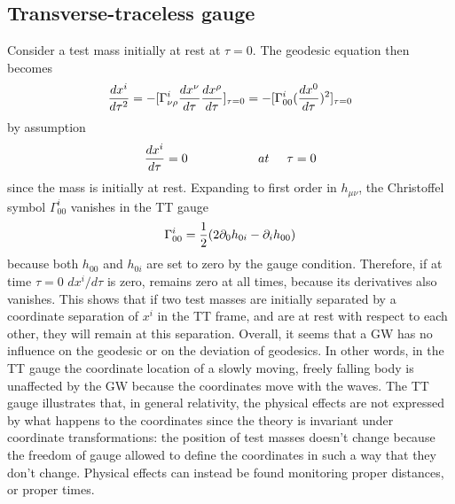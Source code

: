 \documentclass[binding=0.6cm, LaM]{sapthesis}
\begin{document}
\subsection{Transverse-traceless gauge}
Consider a test mass initially at rest at $\tau = 0$. The geodesic equation then becomes
\begin{equation}
{{dx^i}\over{d\tau^2}} = -[\Gamma^i_{\nu\rho}{{dx^{\nu}}\over{d\tau}}{{dx^{\rho}}\over{d\tau}}]_{\tau=0} \\ 
= - [ \Gamma^i_{00}({{dx^0}\over{d\tau}})^2]_{\tau=0}
\end{equation}
by assumption
\begin{equation}
{{dx^i}\over{d\tau}} = 0 \hspace*{2cm} at \hspace*{0.5cm}\tau = 0
\end{equation}
since the mass is initially at rest. Expanding to first order in $h_{\mu\nu}$, the Christoffel symbol $\Gamma^i_{00}$ vanishes in the TT gauge
\begin{equation}
 \Gamma^i_{00} = {1 \over {2}}(2\partial_{0}h_{0i} - \partial_i h_{00})
\end{equation}
because both $h_{00}$ and $h_{0i}$ are set to zero by the gauge condition. Therefore, if at time $\tau = 0$ $dx^i/d\tau$ is zero, remains zero at all times, because its derivatives also vanishes. 
This shows that if two test masses are initially separated by a coordinate separation of $x^i$ in the TT frame, and are at rest with respect to each other, they will remain at this separation. Overall, it seems that a GW has no influence on the geodesic or on the deviation of geodesics. 
In other words, in the TT gauge the coordinate location of a slowly moving, freely falling body is unaffected by the GW because the coordinates move with the waves.
The TT gauge illustrates that, in general relativity, the physical effects are not expressed by what happens to the coordinates since the theory is invariant under coordinate transformations: the position of test masses doesn't change because the freedom of gauge allowed to define the coordinates in such a way that they don't change. Physical effects can instead be found monitoring proper distances, or proper times. 
\end{document}
